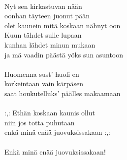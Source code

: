 \hspace{10mm} \\
            Nyt sen kirkastuvan nään  \\
            oonhan täyteen juonut pään  \\
            olet kaunein mitä koskaan nähnyt oon \\
            Kuun tähdet sulle lupaan \\
            kunhan lähdet minun mukaan  \\
            ja mä vaadin päästä yöks sun asuntoon \\
\hspace{10mm} \\
            Huomenna sust' huoli en  \\
            korkeintaan vain kärpäsen  \\
            saat houkutelluks' päälles makaamaan \\
\hspace{10mm} \\
            :,: Ethän koskaan kaunis ollut  \\
            niin jos totta puhutaan \\
            enkä minä enää juovuksissakaan :,: \\
\hspace{10mm} \\
            Enkä minä enää juovuksissakaan! \\
